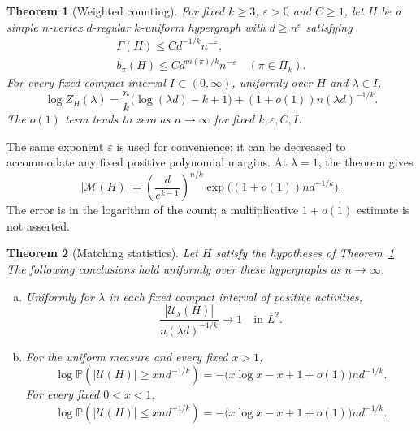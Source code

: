 \documentclass[11pt,reqno]{amsart}
\numberwithin{equation}{section}
\theoremstyle{plain}
\newtheorem{theorem}{Theorem}[section]
\theoremstyle{definition}
\newcommand{\calM}{\mathcal{M}}
\newcommand{\Prob}{\mathbb P}
\newcommand{\eps}{\varepsilon}
\newcommand{\calU}{\mathcal U}
\begin{document}
\begin{theorem}[Weighted counting]\label{thm:weightedcount}\label{thm:counting}
    For fixed $k\ge3$, $\eps>0$ and $C\ge1$, let $H$ be a simple $n$-vertex $d$-regular $k$-uniform hypergraph with $d\ge n^\eps$ satisfying
    \begin{equation}\label{eq:admissibility}
        \begin{gathered}
            \Gamma(H)\le C d^{-1/k}n^{-\eps},\\
            b_\pi(H)\le C d^{m(\pi)/k}n^{-\eps}\quad(\pi\in\Pi_k).
        \end{gathered}
    \end{equation}
    For every fixed compact interval $I\subset(0,\infty)$, uniformly over $H$ and $\lambda\in I$,
    \begin{equation}\label{eq:weightedcount}
        \log Z_H(\lambda)=\frac nk\bigl(\log(\lambda d)-k+1\bigr)
        +(1+o(1))n(\lambda d)^{-1/k}.
    \end{equation}
    The $o(1)$ term tends to zero as $n\to\infty$ for fixed $k,\eps,C,I$.
\end{theorem}

The same exponent $\eps$ is used for convenience; it can be decreased to accommodate any fixed positive polynomial margins.
At $\lambda=1$, the theorem gives
\begin{equation}\label{eq:totalcount}
    |\calM(H)|=\left(\frac d{e^{k-1}}\right)^{n/k}
    \exp\bigl((1+o(1))nd^{-1/k}\bigr).
\end{equation}
The error is in the logarithm of the count; a multiplicative $1+o(1)$ estimate is not asserted.

\begin{theorem}[Matching statistics]\label{thm:statistics}
    Let $H$ satisfy the hypotheses of Theorem~\ref{thm:weightedcount}.
    The following conclusions hold uniformly over these hypergraphs as $n\to\infty$.
    \begin{enumerate}[(a)]
        \item Uniformly for $\lambda$ in each fixed compact interval of positive activities,
            \[
                \frac{|\calU_\lambda(H)|}{n(\lambda d)^{-1/k}}\longrightarrow1\quad\text{in }L^2.
            \]
        \item For the uniform measure and every fixed $x>1$,
            \[
                \log\Prob(|\calU(H)|\ge xnd^{-1/k})
                =-\bigl(x\log x-x+1+o(1)\bigr)nd^{-1/k}.
            \]
            For every fixed $0<x<1$,
            \[
                \log\Prob(|\calU(H)|\le xnd^{-1/k})
                =-\bigl(x\log x-x+1+o(1)\bigr)nd^{-1/k}.
            \]
    \end{enumerate}
\end{theorem}
\end{document}
